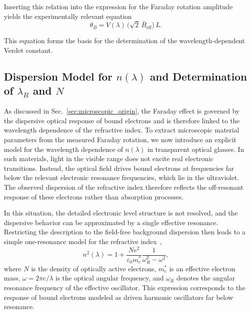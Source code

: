 \documentclass[a4paper]{article}
\begin{document}
Inserting this relation into the expression for the Faraday rotation amplitude yields the experimentally relevant equation
\begin{equation}
  \theta_B = V(\lambda)\,\bigl(\sqrt{2}\,\bar B_{\mathrm{eff}}\bigr)\,L.
  \label{eq:theta_final}
\end{equation}

This equation forms the basis for the determination of the wavelength-dependent Verdet constant.

\subsection{Dispersion Model for \texorpdfstring{$n(\lambda)$}{} and Determination of \texorpdfstring{$\lambda_R$ and $N$}{}}

As discussed in Sec.~\ref{sec:microscopic_origin}, the Faraday effect is governed by the dispersive optical response of bound electrons and is therefore linked to the wavelength dependence of the refractive index.
To extract microscopic material parameters from the measured Faraday rotation, we now introduce an explicit model for the wavelength dependence of $n(\lambda)$ in transparent optical glasses.
In such materials, light in the visible range does not excite real electronic transitions.
Instead, the optical field drives bound electrons at frequencies far below the relevant electronic resonance frequencies, which lie in the ultraviolet.
The observed dispersion of the refractive index therefore reflects the off-resonant response of these electrons rather than absorption processes.

In this situation, the detailed electronic level structure is not resolved, and the dispersive behavior can be approximated by a single effective resonance.
Restricting the description to the field-free background dispersion then leads to a simple one-resonance model for the refractive index~\cite{FARAnleitung},
\[
  n^2(\lambda) = 1 + \frac{N e^2}{\varepsilon_0 m_e^*} \frac{1}{\omega_R^2 - \omega^2},
\]
where $N$ is the density of optically active electrons, $m_e^*$ is an effective electron mass, $\omega = 2\pi c / \lambda$ is the optical angular frequency, and $\omega_R$ denotes the angular resonance frequency of the effective oscillator.
This expression corresponds to the response of bound electrons modeled as driven harmonic oscillators far below resonance.
\end{document}
